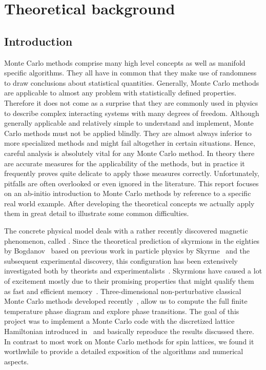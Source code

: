 %
\chapter{Theoretical background}\label{chap:1}
%
\section{Introduction}\label{sec:intro}
%
Monte Carlo methods comprise many high level concepts as well as manifold
specific algorithms. They all have in common that they make use of randomness to
draw conclusions about statistical quantities. Generally, Monte Carlo methods
are applicable to almost any problem with statistically defined properties.
Therefore it does not come as a surprise that they are commonly used in physics
to describe complex interacting systems with many degrees of freedom. Although
generally applicable and relatively simple to understand and implement, Monte
Carlo methods must not be applied blindly. They are almost always inferior to
more specialized methods and might fail altogether in certain situations. Hence,
careful analysis is absolutely vital for any Monte Carlo method. In theory there
are accurate measures for the applicability of the methods, but in practice it
frequently proves quite delicate to apply those measures correctly.
Unfortunately, pitfalls are often overlooked or even ignored in the literature.
This report focuses on an ab-initio introduction to Monte Carlo methods by
reference to a specific real world example. After developing the theoretical
concepts we actually apply them in great detail to illustrate some common
difficulties.

The concrete physical model deals with a rather recently discovered magnetic
phenomenon, called . Since the theoretical prediction of
skyrmions in the eighties by Bogdanov~\cite{bogdanov} based on previous work in
particle physics by Skyrme~\cite{skyrme} and the subsequent experimental
discovery, this configuration has been extensively investigated both by
theorists and experimentalists~\cite{skyrm1, skyrm2, skyrm3, skyrm4, skyrm5,
skyrm6, Milde1076, skyrm8, skyrm9, skyrm10}. Skyrmions have caused a lot of
excitement mostly due to their promising properties that might qualify them as
fast and efficient memory~\cite{switching}. Three-dimensional non-perturbative
classical Monte Carlo methods developed recently~\cite{skyrmionlattice,
Milde1076}, allow us to compute the full finite temperature phase diagram and
explore phase transitions.  The goal of this project was to implement a Monte
Carlo code with the discretized lattice Hamiltonian introduced
in~\cite{skyrmionlattice} and basically reproduce the results discussed there.
In contrast to most work on Monte Carlo methods for spin lattices, we found it
worthwhile to provide a detailed exposition of the algorithms and numerical
aspects.

